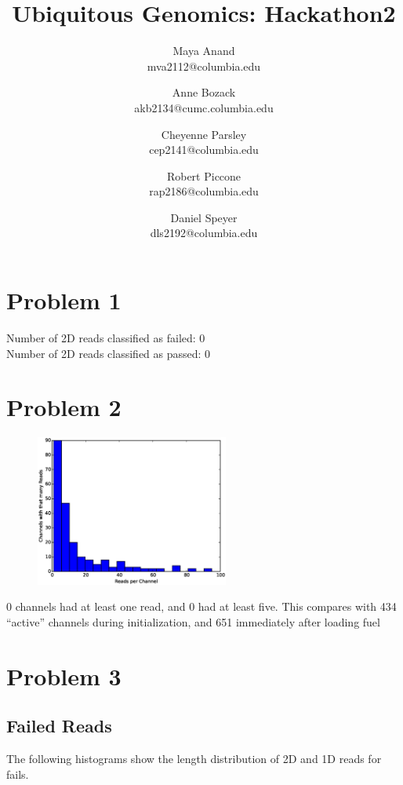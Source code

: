\documentclass[11pt]{article}
\title{Ubiquitous Genomics: Hackathon2}
\author{
  Maya Anand\\ mva2112@columbia.edu \and
  Anne Bozack\\ akb2134@cumc.columbia.edu \and
  Cheyenne Parsley\\ cep2141@columbia.edu \and
  Robert Piccone\\ rap2186@columbia.edu \and
  Daniel Speyer\\ dls2192@columbia.edu}
\begin{document}
\maketitle
\section*{Problem 1}
Number of 2D reads classified as failed: 0\\
Number of 2D reads classified as passed: 0\\
\section*{Problem 2}
\begin{figure}
  \vspace{-20pt}
  \includegraphics[width=2.5in]{part2hist}
  \vspace{-20pt}
\end{figure}
0 channels had at least one read, and 0 had at least five.  
This compares with 434 ``active'' channels during initialization, and 651 immediately after loading fuel

\section*{Problem 3}
\subsection*{Failed Reads}

        The following histograms show the length distribution of 2D and 1D reads for fails.
\end{document}

